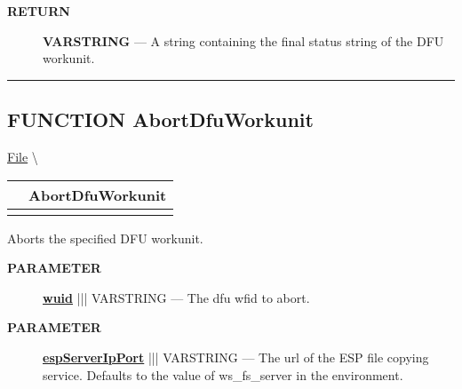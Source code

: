 \par
\begin{description}
\item [\colorbox{tagtype}{\color{white} \textbf{\textsf{RETURN}}}] \textbf{VARSTRING} --- A string containing the final status string of the DFU workunit.
\end{description}




\rule{\linewidth}{0.5pt}
\subsection*{\textsf{\colorbox{headtoc}{\color{white} FUNCTION}
AbortDfuWorkunit}}

\hypertarget{ecldoc:file.abortdfuworkunit}{}
\hspace{0pt} \hyperlink{ecldoc:File}{File} \textbackslash 

{\renewcommand{\arraystretch}{1.5}
\begin{tabularx}{\textwidth}{|>{\raggedright\arraybackslash}l|X|}
\hline
\hspace{0pt}\mytexttt{\color{red} } & \textbf{AbortDfuWorkunit} \\
\hline
\multicolumn{2}{|>{\raggedright\arraybackslash}X|}{\hspace{0pt}\mytexttt{\color{param} (varstring wuid, varstring espServerIpPort=GETENV('ws\_fs\_server'))}} \\
\hline
\end{tabularx}
}

\par





Aborts the specified DFU workunit.






\par
\begin{description}
\item [\colorbox{tagtype}{\color{white} \textbf{\textsf{PARAMETER}}}] \textbf{\underline{wuid}} ||| VARSTRING --- The dfu wfid to abort.
\item [\colorbox{tagtype}{\color{white} \textbf{\textsf{PARAMETER}}}] \textbf{\underline{espServerIpPort}} ||| VARSTRING --- The url of the ESP file copying service. Defaults to the value of ws\_fs\_server in the environment.
\end{description}







